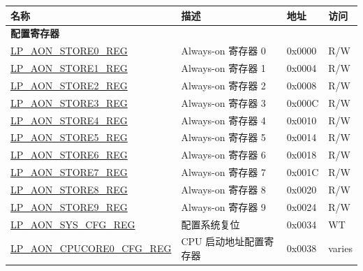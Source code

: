 \begin{longtable}{ | l | p{6.5cm} | p{1.3cm} | p{1cm} | }
\hline\rowcolor{lightgray}
\textbf{名称} & \textbf{描述} &  \textbf{地址} & \textbf{访问} \\ \hline
\endhead
\multicolumn{4}{|l|}{\textbf{配置寄存器}} \\ \hline
\hyperref[regdesc:LPAONSTORENREG]{LP\_AON\_STORE0\_REG} & Always-on 寄存器 0 & 0x0000 & R/W \\ \hline
\hyperref[regdesc:LPAONSTORENREG]{LP\_AON\_STORE1\_REG} & Always-on 寄存器 1 & 0x0004 & R/W \\ \hline
\hyperref[regdesc:LPAONSTORENREG]{LP\_AON\_STORE2\_REG} & Always-on 寄存器 2 & 0x0008 & R/W \\ \hline
\hyperref[regdesc:LPAONSTORENREG]{LP\_AON\_STORE3\_REG} & Always-on 寄存器 3 & 0x000C & R/W \\ \hline
\hyperref[regdesc:LPAONSTORENREG]{LP\_AON\_STORE4\_REG} & Always-on 寄存器 4 & 0x0010 & R/W \\ \hline
\hyperref[regdesc:LPAONSTORENREG]{LP\_AON\_STORE5\_REG} & Always-on 寄存器 5 & 0x0014 & R/W \\ \hline
\hyperref[regdesc:LPAONSTORENREG]{LP\_AON\_STORE6\_REG} & Always-on 寄存器 6 & 0x0018 & R/W \\ \hline
\hyperref[regdesc:LPAONSTORENREG]{LP\_AON\_STORE7\_REG} & Always-on 寄存器 7 & 0x001C & R/W \\ \hline
\hyperref[regdesc:LPAONSTORENREG]{LP\_AON\_STORE8\_REG} & Always-on 寄存器 8 & 0x0020 & R/W \\ \hline
\hyperref[regdesc:LPAONSTORENREG]{LP\_AON\_STORE9\_REG} & Always-on 寄存器 9 & 0x0024 & R/W \\ \hline
\hyperref[regdesc:LPAONSYSCFGREG]{LP\_AON\_SYS\_CFG\_REG} & 配置系统复位 & 0x0034 & WT \\ \hline
\hyperref[regdesc:LPAONCPUCORE0CFGREG]{LP\_AON\_CPUCORE0\_CFG\_REG} & CPU 启动地址配置寄存器 & 0x0038 & varies \\ \hline
\end{longtable}
